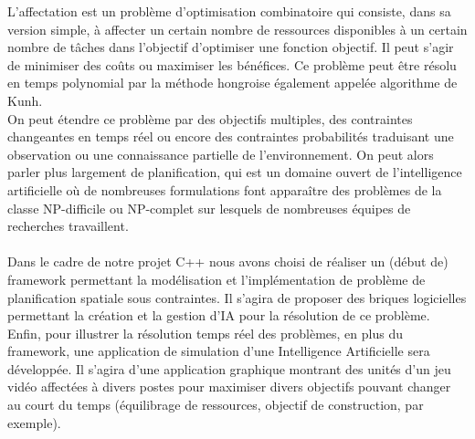 L'affectation est un problème d’optimisation combinatoire qui consiste, dans sa version simple, à affecter un certain nombre de ressources disponibles à un certain nombre de tâches dans l'objectif d'optimiser une fonction objectif. Il peut s'agir de minimiser des coûts ou maximiser les bénéfices. Ce problème peut être résolu en temps polynomial par la méthode hongroise également appelée algorithme de Kunh.\\
On peut étendre ce problème par des objectifs multiples, des contraintes changeantes en temps réel ou encore des contraintes probabilités traduisant une observation ou une connaissance partielle de l'environnement. On peut alors parler plus largement de planification, qui est un domaine ouvert de l'intelligence artificielle où de nombreuses formulations font apparaître des problèmes de la classe NP-difficile ou NP-complet sur lesquels de nombreuses équipes de recherches travaillent.\\\\

Dans le cadre de notre projet C++ nous avons choisi de réaliser un (début de) framework permettant la modélisation et l'implémentation de problème de planification spatiale sous contraintes. Il s'agira de proposer des briques logicielles permettant la création et la gestion d'IA pour la résolution de ce problème.\\
Enfin, pour illustrer la résolution temps réel des problèmes, en plus du framework, une application de simulation d'une Intelligence Artificielle sera développée. Il s'agira d'une application graphique montrant des unités d'un jeu vidéo affectées à divers postes pour maximiser divers objectifs pouvant changer au court du temps (équilibrage de ressources, objectif de construction, par exemple).
